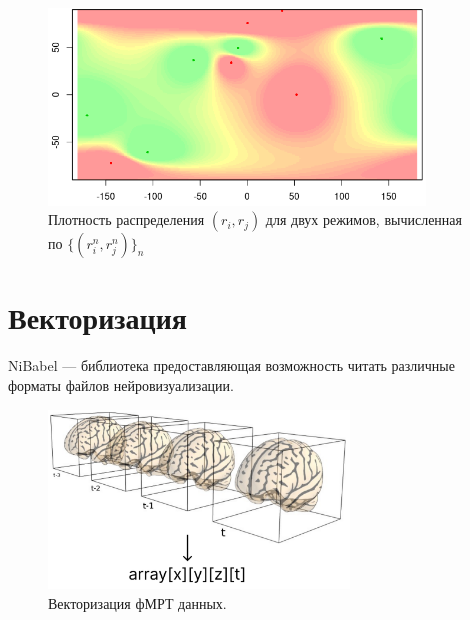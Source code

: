 \documentclass{beamer}
\begin{document}
	\begin{frame} 
		\vspace{0.4cm}
		
		\begin{figure}
			\includegraphics[width=10cm]{../images/classification.png}
			\caption{Плотность распределения $(r_i, r_j)$ для двух режимов, вычисленная по $\{(r_i^n, r_j^n)\}_n$} 
			\label{fg:4}
		\end{figure}
	\end{frame}

	\section{Векторизация}
	\begin{frame} 		
		NiBabel --- библиотека предоставляющая возможность читать различные форматы файлов нейровизуализации.
		\vspace{0.8cm}
		
		\begin{figure}
			\includegraphics[width=8cm]{../images/vectorization_2.pdf}
			\caption{Векторизация фМРТ данных.} 
			\label{fg:4}
		\end{figure}
	\end{frame}
\end{document}
